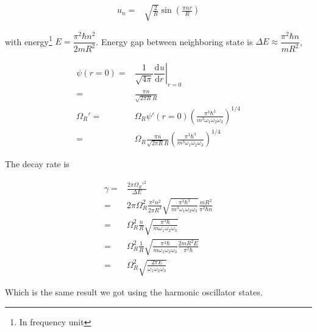 \documentclass[10pt,fleqn]{article}
\newcommand{\ud}{\mathrm{d}}
\newcommand{\eqar}[1]
{
  \begin{align*}
    #1
  \end{align*}
}
\newcommand{\paren}[1]{{\left({#1}\right)}}
\newcommand{\ddiff}[3][{}]{{\dfrac{\ud^{#1} {#2}}{\ud {#3}{}^{#1}}}}
\begin{document}
\eqar{
  u_n=&\sqrt{\frac{2}{R}}\sin\paren{\frac{\pi nr}{R}}
}

with energy\footnote{In frequency unit} $E=\dfrac{\pi^2\hbar n^2}{2mR^2}$.
Energy gap between neighboring state is $\Delta E\approx\dfrac{\pi^2\hbar n}{mR^2}$,

\eqar{
  \psi(r=0)=&\left.\dfrac{1}{\sqrt{4\pi}}\ddiff{u}{r}\right|_{r=0}\\
  =&\frac{\pi n}{\sqrt{2\pi R}R}\\
  \Omega_R'=&\Omega_R\psi'(r=0)\paren{\frac{\pi^3\hbar^3}{m^3\omega_1\omega_2\omega_3}}^{1/4}\\
  =&\Omega_R\frac{\pi n}{\sqrt{2\pi R}R}\paren{\frac{\pi^3\hbar^3}{m^3\omega_1\omega_2\omega_3}}^{1/4}
}

The decay rate is
\eqar{
  \gamma=&\frac{2\pi\Omega_R'^2}{\Delta E}\\
  =&2\pi\Omega_R^2\frac{\pi^2 n^2}{2\pi R^3}\sqrt{\frac{\pi^3\hbar^3}{m^3\omega_1\omega_2\omega_3}}\frac{mR^2}{\pi^2\hbar n}\\
  =&\Omega_R^2\frac{n}{R}\sqrt{\frac{\pi^3\hbar}{m\omega_1\omega_2\omega_3}}\\
  =&\Omega_R^2\frac{1}{R}\sqrt{\frac{\pi^3\hbar}{m\omega_1\omega_2\omega_3}\frac{2mR^2E}{\pi^2\hbar}}\\
  =&\Omega_R^2\sqrt{\frac{2\pi E}{\omega_1\omega_2\omega_3}}
}
Which is the same result we got using the harmonic oscillator states.
\end{document}
